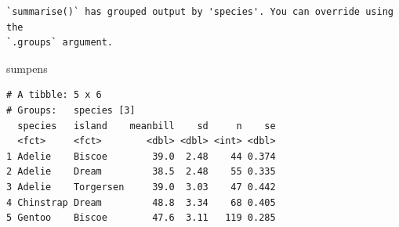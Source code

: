 \documentclass[
  letterpaper,
  DIV=11,
  numbers=noendperiod]{scrartcl}
\newenvironment{Shaded}{\begin{snugshade}}{\end{snugshade}}
\newcommand{\NormalTok}[1]{\textcolor[rgb]{0.00,0.23,0.31}{#1}}
\begin{document}
\begin{verbatim}
`summarise()` has grouped output by 'species'. You can override using the
`.groups` argument.
\end{verbatim}

\begin{Shaded}
\begin{Highlighting}[]
\NormalTok{sumpens}
\end{Highlighting}
\end{Shaded}

\begin{verbatim}
# A tibble: 5 x 6
# Groups:   species [3]
  species   island    meanbill    sd     n    se
  <fct>     <fct>        <dbl> <dbl> <int> <dbl>
1 Adelie    Biscoe        39.0  2.48    44 0.374
2 Adelie    Dream         38.5  2.48    55 0.335
3 Adelie    Torgersen     39.0  3.03    47 0.442
4 Chinstrap Dream         48.8  3.34    68 0.405
5 Gentoo    Biscoe        47.6  3.11   119 0.285
\end{verbatim}
\end{document}

